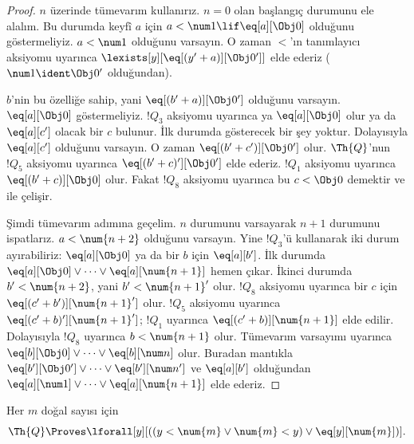 \documentclass[../../../include/open-logic-section]{subfiles}
\begin{document}
\begin{proof}
$n$ üzerinde tümevarım kullanırız. $n=0$ olan başlangıç durumunu ele alalım.
Bu durumda keyfî $a$ için $a<\num 1\lif\eq[a][\Obj 0]$ olduğunu
göstermeliyiz. $a<\num 1$ olduğunu varsayın. O zaman $<$'ın tanımlayıcı
aksiyomu uyarınca $\lexists[y][\eq[(y'+a)][\Obj 0']]$ elde ederiz
($\num 1\ident\Obj 0'$ olduğundan).

$b$'nin bu özelliğe sahip, yani $\eq[(b'+a)][\Obj 0']$ olduğunu varsayın.
$\eq[a][\Obj 0]$ göstermeliyiz. $!Q_3$ aksiyomu uyarınca ya
$\eq[a][\Obj 0]$ olur ya da $\eq[a][c']$ olacak bir $c$ bulunur. İlk durumda
gösterecek bir şey yoktur. Dolayısıyla $\eq[a][c']$ olduğunu varsayın.
O zaman $\eq[(b'+c')][\Obj 0']$ olur. $\Th{Q}$'nun $!Q_5$ aksiyomu
uyarınca $\eq[(b'+c)'][\Obj 0']$ elde ederiz. $!Q_1$ aksiyomu uyarınca
$\eq[(b'+c)][\Obj 0]$ olur. Fakat $!Q_8$ aksiyomu uyarınca bu
$c<\Obj 0$ demektir ve  ile çelişir.

Şimdi tümevarım adımına geçelim. $n$ durumunu varsayarak $n+1$ durumunu
ispatlarız. $a<\num{n+2}$ olduğunu varsayın. Yine $!Q_3$'ü kullanarak iki
durum ayırabiliriz: $\eq[a][\Obj 0]$ ya da bir $b$ için $\eq[a][b']$.
İlk durumda $\eq[a][\Obj 0]\lor\dots\lor\eq[a][\num{n+1}]$ hemen çıkar.
İkinci durumda $b'<\num{n+2}$, yani $b'<\num{n+1}'$ olur. $!Q_8$ aksiyomu
uyarınca bir $c$ için $\eq[(c'+b')][\num{n+1}']$ olur. $!Q_5$ aksiyomu
uyarınca $\eq[(c'+b)'][\num{n+1}']$; $!Q_1$ uyarınca
$\eq[(c'+b)][\num{n+1}]$ elde edilir. Dolayısıyla $!Q_8$ uyarınca
$b<\num{n+1}$ olur. Tümevarım varsayımı uyarınca
$\eq[b][\Obj 0]\lor\dots\lor\eq[b][\num n]$ olur. Buradan mantıkla
$\eq[b'][\Obj 0']\lor\dots\lor\eq[b'][\num n']$ ve $\eq[a][b']$
olduğundan $\eq[a][\num 1]\lor\dots\lor\eq[a][\num{n+1}]$ elde ederiz.
\end{proof}

\begin{lem}
   Her $m$ doğal sayısı için
  \[
  \Th{Q} \Proves
  \lforall[y][((y < \num{m} \lor \num{m} < y) \lor \eq[y][\num{m}])].
  \]
\end{lem}
\end{document}
